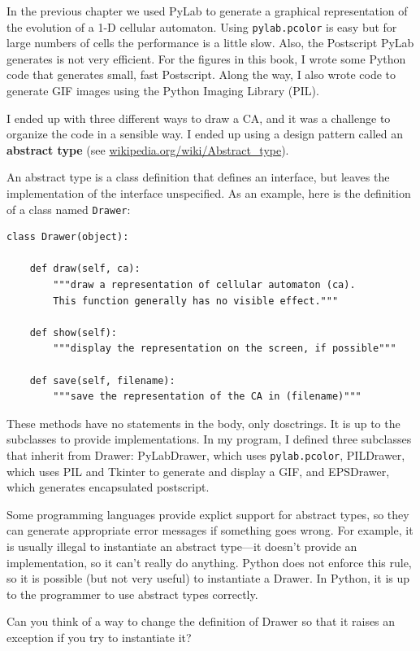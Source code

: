 \documentclass[10pt]{book}
\begin{document}
In the previous chapter we used PyLab to generate a graphical
representation of the evolution of a 1-D cellular automaton.  Using
{\tt pylab.pcolor} is easy but for large numbers of cells the
performance is a little slow.  Also, the Postscript PyLab generates is
not very efficient.  For the figures in this book, I wrote some Python
code that generates small, fast Postscript.
Along the way, I also wrote code to generate GIF images using
the Python Imaging Library (PIL).

I ended up with three different ways to draw a CA, and it was
a challenge to organize the code in a sensible way.  I ended up
using a design pattern called an {\bf abstract type} (see
\url{wikipedia.org/wiki/Abstract_type}).

An abstract type is a class definition that defines an interface, but
leaves the implementation of the interface unspecified.  As an
example, here is the definition of a class named {\tt Drawer}:

\begin{verbatim}
class Drawer(object):

    def draw(self, ca):
        """draw a representation of cellular automaton (ca).
        This function generally has no visible effect."""
    
    def show(self):
        """display the representation on the screen, if possible"""

    def save(self, filename):
        """save the representation of the CA in (filename)"""        
\end{verbatim}

These methods have no statements in the body, only dosctrings.
It is up to the subclasses to provide implementations.
In my program, I defined three subclasses that inherit from
Drawer: PyLabDrawer, which uses {\tt pylab.pcolor}, 
PILDrawer, which uses PIL and Tkinter to generate and display
a GIF, and EPSDrawer, which generates encapsulated postscript.

Some programming languages provide explict support for abstract types,
so they can generate appropriate error messages if something goes
wrong.  For example, it is usually illegal to instantiate an abstract
type---it doesn't provide an implementation, so it can't really do
anything.  Python does not enforce this rule, so it is possible (but
not very useful) to instantiate a Drawer.  In Python, it is up to the
programmer to use abstract types correctly.


\begin{ex}
Can you think of a way to change the definition of Drawer
so that it raises an exception if you try to instantiate it?
\end{ex}
\end{document}
